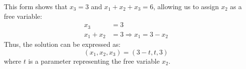 \documentclass[12pt]{amsart}
\begin{document}
This form shows that \( x_3 = 3 \) and \( x_1 + x_2 + x_3 = 6 \), allowing us to assign \( x_2 \) as a free variable:
\begin{align*}
x_3 &= 3 \\
x_1 + x_2 &= 3 \Rightarrow x_1 = 3 - x_2
\end{align*}
Thus, the solution can be expressed as:
\begin{equation*}
(x_1, x_2, x_3) = (3 - t, t, 3)
\end{equation*}
where \( t \) is a parameter representing the free variable \( x_2 \).
\end{document}
